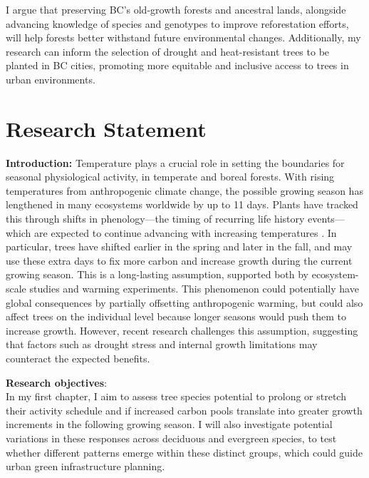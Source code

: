 \documentclass[11pt,letter]{article}
\begin{document}
I argue that preserving BC's old-growth forests and ancestral lands, alongside advancing knowledge of species and genotypes to improve reforestation efforts, will help forests better withstand future environmental changes. Additionally, my research can inform the selection of drought and heat-resistant trees to be planted in BC cities, promoting more equitable and inclusive access to trees in urban environments.

\section* {Research Statement}
\textbf{Introduction:}
Temperature plays a crucial role in setting the boundaries for seasonal physiological activity, in temperate and boreal forests. With rising temperatures from anthropogenic climate change, the possible growing season has lengthened in many ecosystems worldwide by up to 11 days. \citep{menzel_growing_1999} Plants have tracked this through shifts in phenology—the timing of recurring life history events—which are expected to continue advancing with increasing temperatures \citep{wolkovich_warming_2012}. In particular, trees have shifted earlier in the spring and later in the fall, and may use these extra days to fix more carbon and increase growth during the current growing season. \citep{keenan_net_2014} This is a long-lasting assumption, supported both by ecosystem-scale studies and warming experiments. This phenomenon could potentially have global consequences by partially offsetting anthropogenic warming, but could also affect trees on the individual level because longer seasons would push them to increase growth. \citep{grossiord_warming_2022} However, recent research challenges this assumption, suggesting that factors such as drought stress and internal growth limitations may counteract the expected benefits. \citep{dow_warm_2022}  
\par
\textbf{Research objectives}: \\
In my first chapter, I aim to assess tree species potential to prolong or stretch their activity schedule and if increased carbon pools translate into greater growth increments in the following growing season. I will also investigate potential variations in these responses across deciduous and evergreen species, to test whether different patterns emerge within these distinct groups, which could guide urban green infrastructure planning. \\
\end{document}
